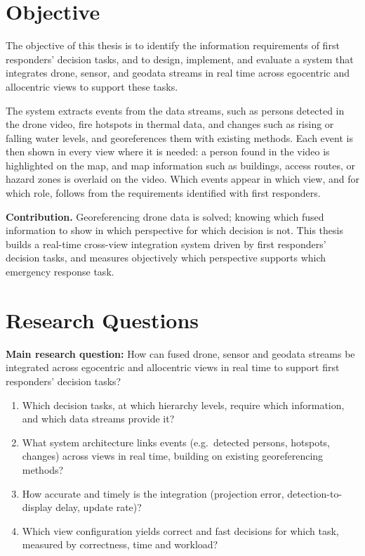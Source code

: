 \documentclass{article}
\begin{document}
\section{Objective}
The objective of this thesis is to identify the information requirements of first responders' decision tasks, and to design, implement, and evaluate a system that integrates drone, sensor, and geodata streams in real time across egocentric and allocentric views to support these tasks.

The system extracts events from the data streams, such as persons detected in the drone video, fire hotspots in thermal data, and changes such as rising or falling water levels, and georeferences them with existing methods.
Each event is then shown in every view where it is needed: a person found in the video is highlighted on the map, and map information such as buildings, access routes, or hazard zones is overlaid on the video.
Which events appear in which view, and for which role, follows from the requirements identified with first responders.

\textbf{Contribution.}
Georeferencing drone data is solved; knowing which fused information to show in which perspective for which decision is not.
This thesis builds a real-time cross-view integration system driven by first responders' decision tasks, and measures objectively which perspective supports which emergency response task.

\section{Research Questions}
\textbf{Main research question:} How can fused drone, sensor and geodata streams be integrated across egocentric and allocentric views in real time to support first responders' decision tasks?

\begin{enumerate}[label=\textbf{RQ\arabic*}]
  \item Which decision tasks, at which hierarchy levels, require which information, and which data streams provide it?
  \item What system architecture links events (e.g.\ detected persons, hotspots, changes) across views in real time, building on existing georeferencing methods?
  \item How accurate and timely is the integration (projection error, detection-to-display delay, update rate)?
  \item Which view configuration yields correct and fast decisions for which task, measured by correctness, time and workload?
\end{enumerate}
\end{document}
